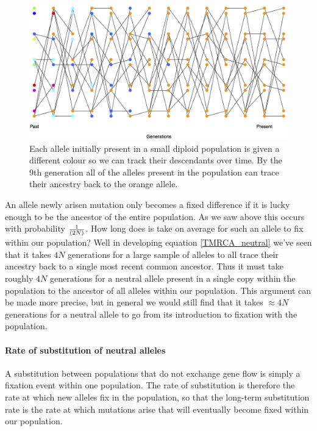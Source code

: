 \begin{figure}
\begin{center}
  \includegraphics[width = \textwidth]{figures/Substitution_sim.png}
\end{center}
\caption{Each allele initially present in a small diploid population is
  given a different colour so we can track their descendants over
  time. By the 9th generation all of the alleles present in the
  population can trace their ancestry back to the orange allele.} \label{fig:subs_simulation}
\end{figure}


An allele newly arisen mutation only becomes a fixed difference if it is lucky
enough to be the ancestor of the entire population. As we saw above this occurs
with probability $\nicefrac{1}{(2N)}$. How long does is take on average for
such an allele to fix within our population? Well in developing
equation \eqref{TMRCA_neutral} we've seen that it takes $4N$
generations for a large sample of alleles to all trace their ancestry back to a
single most recent common ancestor. Thus it must take roughly $4N$ generations
for a neutral allele present in a single copy within the population to the
ancestor of all alleles within our population. This argument can be made more
precise, but in general we would still find that it takes $\approx 4N$
generations for a neutral allele to go from its introduction to fixation with
the population.   \\

\paragraph{Rate of substitution of neutral alleles}

A substitution between populations that do not exchange gene flow is simply a
fixation event within one population. The rate of substitution is therefore the
rate at which new alleles fix in the population, so that the long-term
substitution rate is the rate at which mutations arise that will eventually
become fixed within our population.\\

